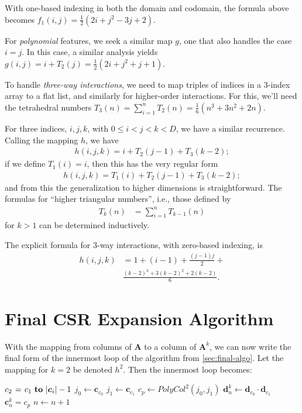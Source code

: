 \documentclass{article} %
\begin{document}
With one-based indexing in both the domain and codomain, the formula above becomes
$f_1(i, j)  = \frac{1}{2}(2i + j^2 - 3j + 2).$

For \emph{polynomial} features, we seek a similar map $g$, one that also handles the case $i = j$. In this case, a similar analysis yields
$ g(i, j) = i + T_2(j) = \frac{1}{2} (2i + j^2 + j + 1).$


To handle \emph{three-way interactions}, we need to map triples of indices in a 3-index array to a flat list, and similarly for higher-order interactions. For this, we'll need the tetrahedral numbers $T_3(n) = \sum_{i=1}^n T_{2}(n) = 
\frac{1}{6}(n^3 + 3n^2 + 2n)$.

For three indices, $i,j,k$, with $0 \le i < j < k < D$, we have a similar recurrence. Calling the mapping $h$, we have 
\begin{align}
h(i,j,k) = i + T_2(j-1) + T_3(k-2);
\end{align}
if we define $T_1(i) = i$, then this has the very regular form
\begin{align}
h(i,j,k) =  T_1(i) + T_2(j-1) + T_3(k-2);
\end{align}
and from this the generalization to higher dimensions is straightforward. The formulas for ``higher triangular numbers'', i.e., those defined by
\begin{align}
T_k(n) &= \sum_{i=1}^n T_{k-1}(n)
\end{align}
for $k > 1$ can be determined inductively.

The explicit formula for 3-way interactions, with zero-based indexing, is 
\begin{align}
h(i, j, k) &= 1 + (i-1) + \frac{(j-1)j}{2} + \\
& \frac{(k-2)^3 + 3(k-2)^2 + 2(k-2)}{6}. 
\end{align}

\section{Final CSR Expansion Algorithm}
With the mapping from columns of $\bm{A}$ to a column of $\bm{A}^k$, we can now write the final form of the innermost loop of the algorithm from \ref{sec:final-algo}.
Let the mapping for $k=2$ be denoted $h^2$.
Then the innermost loop becomes:

\begin{codebox}
\footnotesize
    \zi         \For $c_2 \gets c_1 \To |\bm{c}_i|-1$ \Do
    \zi             $j_0 \gets \bm{c}_{c_0}$
    \zi             $j_1 \gets \bm{c}_{c_1}$
    \zi             $c_p \gets PolyCol^2(j_0, j_1)$
    \zi             $\bm{d}^k_{n} \gets \bm{d}_{c_0} \cdot \bm{d}_{c_1}$
    \zi             $\bm{c}^k_{n} = c_p$
    \zi             $n \gets n + 1$
                \End
\end{codebox}
\end{document}
